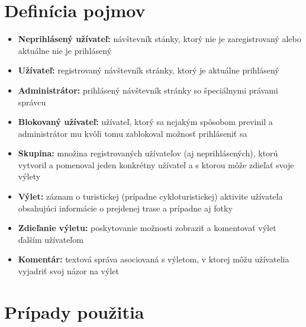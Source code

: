 \documentclass[12pt,a4paper]{scrartcl}
\begin{document}
\section{Definícia pojmov}
\begin{itemize}
	\item{\bf Neprihlásený užívateľ:} návštevník stánky, ktorý nie je zaregistrovaný alebo aktuálne nie je prihlásený
	\item{\bf Užívateľ:} registrovaný návštevník stránky, ktorý je aktuálne prihlásený
	\item{\bf Administrátor:} prihlásený návštevník stránky so špeciálnymi právami správcu
	\item{\bf Blokovaný užívateľ:} užívateľ, ktorý sa nejakým spôsobom previnil a administrátor mu kvôli tomu zablokoval možnosť prihláseniť sa
	\item{\bf Skupina:} množina registrovaných užívateľov (aj neprihlásených), ktorú vytvoril a pomenoval jeden konkrétny užívateľ a s ktorou môže zdieľať svoje výlety
	\item{\bf Výlet:} záznam o turistickej (prípadne cykloturistickej) aktivite užívateľa obsahujúci informácie o prejdenej trase a prípadne aj fotky
	\item{\bf Zdieľanie výletu:} poskytovanie možnosti zobraziť a komentovať výlet ďalším užívateľom 
	\item{\bf Komentár:} textová správa asociovaná s výletom, v ktorej môžu užívatelia vyjadriť svoj názor na výlet
\end{itemize}

\section{Prípady použitia}
\end{document}
